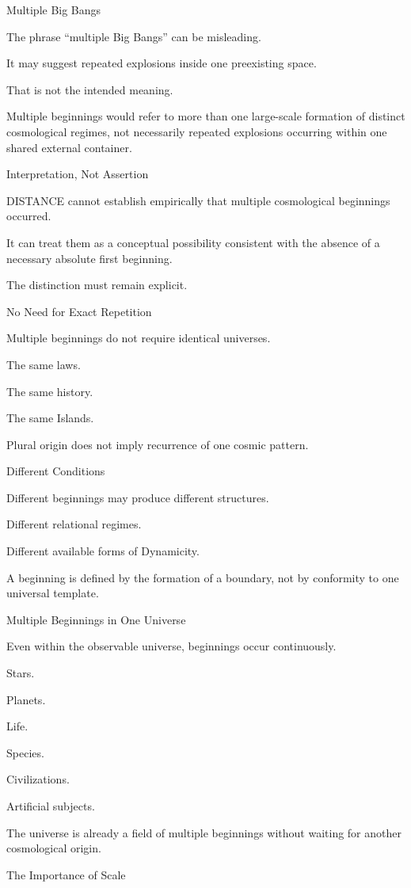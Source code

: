 Multiple Big Bangs

The phrase “multiple Big Bangs” can be misleading.

It may suggest repeated explosions inside one preexisting space.

That is not the intended meaning.

Multiple beginnings would refer to more than one large-scale formation of distinct cosmological regimes, not necessarily repeated explosions occurring within one shared external container.

Interpretation, Not Assertion

DISTANCE cannot establish empirically that multiple cosmological beginnings occurred.

It can treat them as a conceptual possibility consistent with the absence of a necessary absolute first beginning.

The distinction must remain explicit.

No Need for Exact Repetition

Multiple beginnings do not require identical universes.

The same laws.

The same history.

The same Islands.

Plural origin does not imply recurrence of one cosmic pattern.

Different Conditions

Different beginnings may produce different structures.

Different relational regimes.

Different available forms of Dynamicity.

A beginning is defined by the formation of a boundary, not by conformity to one universal template.

Multiple Beginnings in One Universe

Even within the observable universe, beginnings occur continuously.

Stars.

Planets.

Life.

Species.

Civilizations.

Artificial subjects.

The universe is already a field of multiple beginnings without waiting for another cosmological origin.

The Importance of Scale

